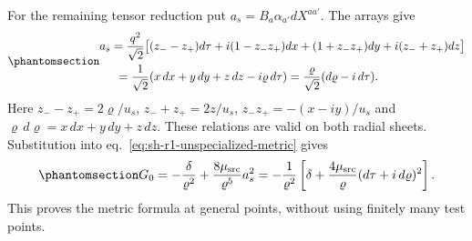 \documentclass[
  english,
  11pt,
  reqno]{amsart}
\begin{document}
For the remaining tensor reduction put \(a_s=B_a\alpha_{a'}dX^{aa'}\).
The arrays give
\begin{equation}\protect\phantomsection\label{eq:sh-r1-null-form}{
 \begin{aligned}
 a_s=\frac{q^2}{\sqrt2}\bigl[&(z_--z_+)d\tau
   +i(1-z_-z_+)dx+(1+z_-z_+)dy
   +i(z_-+z_+)dz\bigr]\\
 =\frac1{\sqrt2}&(x\,dx+y\,dy+z\,dz-i\varrho\,d\tau)
 =\frac{\varrho}{\sqrt2}(d\varrho-i\,d\tau).
 \end{aligned}
}\end{equation} Here \(z_--z_+=2\varrho/u_s\), \(z_-+z_+=2z/u_s\),
\(z_-z_+=-(x-iy)/u_s\) and \(\varrho\,d\varrho=x\,dx+y\,dy+z\,dz\).
These relations are valid on both radial sheets. Substitution into
eq.~\ref{eq:sh-r1-unspecialized-metric} gives
\begin{equation}\protect\phantomsection\label{eq:sh-r1-metric-reduction}{
 G_0=-\frac\delta{\varrho^2}+\frac{8\mu_{\rm src}}{\varrho^5}a_s^2
 =-\frac1{\varrho^2}
   \left[\delta+\frac{4\mu_{\rm src}}{\varrho}
                          (d\tau+i\,d\varrho)^2\right].
}\end{equation} This proves the metric formula at general points,
without using finitely many test points.
\end{document}
